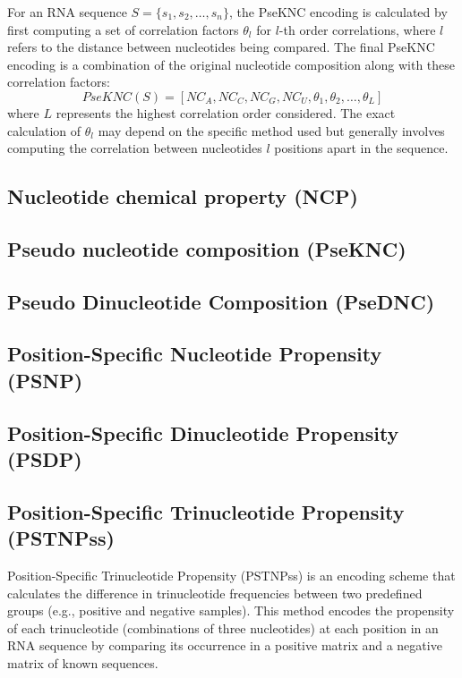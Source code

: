       For an RNA sequence $S = \{s_1, s_2, \dots, s_n\}$, the PseKNC encoding is calculated by first computing a set of correlation factors $\theta_l$ for $l$-th order correlations, where $l$ refers to the distance between nucleotides being compared. The final PseKNC encoding is a combination of the original nucleotide composition along with these correlation factors:
      \[
        PseKNC(S) = [NC_A, NC_C, NC_G, NC_U, \theta_1, \theta_2, \dots, \theta_L]
      \]
      where $L$ represents the highest correlation order considered.
      The exact calculation of $\theta_l$ may depend on the specific method used but generally involves computing the correlation between nucleotides $l$ positions apart in the sequence.

  \subsection{Nucleotide chemical property (NCP)}\label{enc:NCP}

  \subsection{Pseudo nucleotide composition (PseKNC)}\label{enc:PseKNC}

  \subsection{Pseudo Dinucleotide Composition (PseDNC)}\label{enc:PseDNC}

  \subsection{Position-Specific Nucleotide Propensity (PSNP)}\label{enc:PSNP}

  \subsection{Position-Specific Dinucleotide Propensity (PSDP)}\label{enc:PSDP}

  \subsection{Position-Specific Trinucleotide Propensity (PSTNPss)}\label{subsec:pstnpss}
    Position-Specific Trinucleotide Propensity (PSTNPss) is an encoding scheme that calculates the difference in trinucleotide frequencies between two predefined groups (e.g., positive and negative samples). This method encodes the propensity of each trinucleotide (combinations of three nucleotides) at each position in an RNA sequence by comparing its occurrence in a positive matrix and a negative matrix of known sequences.

